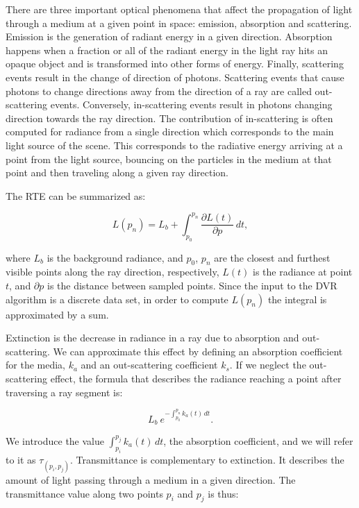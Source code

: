 There are three important optical phenomena that affect the propagation of light through a medium at a given point in space: emission, absorption and scattering.
Emission is the generation of radiant energy in a given direction.
Absorption happens when a fraction or all of the radiant energy in the light ray hits an opaque object and is transformed into other forms of energy. 
%
Finally, scattering events result in the change of direction of photons. 
Scattering events that cause photons to change directions away from the direction of a ray are called out-scattering events. Conversely, in-scattering events result in photons changing direction towards the ray direction.
%
The contribution of in-scattering is often computed for radiance from a single direction which corresponds to the main light source of the scene.
This corresponds to the radiative energy arriving at a point from the light source, bouncing on the particles in the medium at that point and then traveling along a given ray direction.

The RTE can be summarized as:

\begin{equation} \label{eq:general_radiance}  
  L(p_n) = L_b + \int_{p_0}^{p_n} \frac{\partial L(t)}{\partial p} \, dt,
\end{equation}

\noindent where $L_b$ is the background radiance, and $p_0$, $p_n$ are the closest and furthest visible points along the ray direction, respectively, $L(t)$ is the radiance at point $t$, and $\partial p$ is the distance between sampled points. 
Since the input to the DVR algorithm is a discrete data set, in order to compute $L(p_n)$ the integral is approximated by a sum.

Extinction is the decrease in radiance in a ray due to absorption and out-scattering.
We can approximate this effect by defining an absorption coefficient for the media, $k_a$ and an out-scattering coefficient $k_s$. 
If we neglect the out-scattering effect, the formula that describes the radiance reaching a point after traversing a ray segment is:

\begin{equation} \label{eq:radiance_absorption}  
    L_b \ e^{- \textstyle  \int_{p_0}^{p_n} k_a(t) \, dt}.
\end{equation}

We introduce the value $\int_{p_i}^{p_j} k_a(t) \, dt$, the absorption coefficient, and we will refer to it as $\tau_{(p_i, p_j)}$. 
Transmittance is complementary to extinction. It describes the amount of light passing through a medium in a given direction. 
The transmittance value along two points $p_i$ and $p_j$ is thus:

